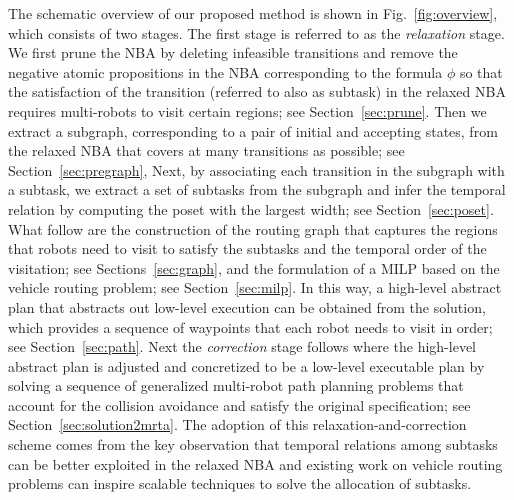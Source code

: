 \documentclass[journal]{IEEEtran}
\begin{document}
{The schematic overview of our proposed  method is shown in Fig.~\ref{fig:overview}, which consists of two stages. The first stage is referred to as the {\it relaxation} stage. We first prune the NBA by deleting infeasible transitions and remove  the negative atomic propositions in the NBA corresponding to the formula $\phi$ so that the satisfaction of the transition (referred to also as subtask) in the relaxed NBA requires multi-robots to visit certain regions; see Section~\ref{sec:prune}. Then we extract a subgraph, corresponding to a pair of initial and accepting states, from the relaxed NBA that covers at many transitions as possible; see Section~\ref{sec:pregraph}, Next, by associating each transition in the subgraph with a subtask, we extract a set of subtasks from the subgraph and infer the temporal relation by computing the poset with the largest width; see Section~\ref{sec:poset}. What follow are the construction of the routing graph that captures the regions that robots need to visit to satisfy the subtasks and the temporal order of the visitation; see Sections~\ref{sec:graph}, and the formulation of a MILP based on the vehicle routing problem; see Section~\ref{sec:milp}. In this way, a high-level abstract plan that abstracts out low-level execution can be obtained from the solution, which provides a sequence of waypoints that each robot needs to visit in order; see Section~\ref{sec:path}. Next the {\it correction} stage follows  where the high-level abstract plan is adjusted and concretized to be a low-level executable plan by solving a sequence of generalized multi-robot path planning problems that account for the collision avoidance and satisfy the original specification; see Section~\ref{sec:solution2mrta}.  The adoption of this relaxation-and-correction scheme comes from the key observation that temporal relations among subtasks can be better exploited in the relaxed NBA and existing work on vehicle routing problems can inspire scalable techniques to solve the allocation of subtasks.

}
\end{document}
